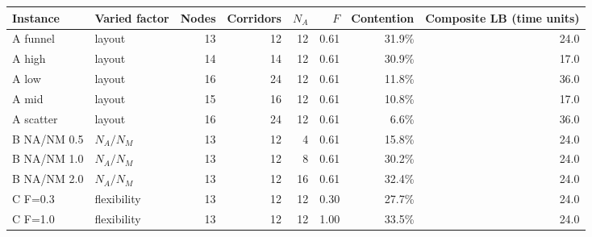 \begin{adjustbox}{max width=\linewidth}\begin{tabular}{@{}llrrrrrr@{}}
\toprule
Instance & Varied factor & Nodes & Corridors & $N_A$ & $F$ & Contention & Composite LB (time units) \\
\midrule
A funnel & layout & 13 & 12 & 12 & 0.61 & 31.9\% & 24.0 \\
A high & layout & 14 & 14 & 12 & 0.61 & 30.9\% & 17.0 \\
A low & layout & 16 & 24 & 12 & 0.61 & 11.8\% & 36.0 \\
A mid & layout & 15 & 16 & 12 & 0.61 & 10.8\% & 17.0 \\
A scatter & layout & 16 & 24 & 12 & 0.61 & 6.6\% & 36.0 \\
\midrule
B NA/NM 0.5 & $N_A/N_M$ & 13 & 12 & 4 & 0.61 & 15.8\% & 24.0 \\
B NA/NM 1.0 & $N_A/N_M$ & 13 & 12 & 8 & 0.61 & 30.2\% & 24.0 \\
B NA/NM 2.0 & $N_A/N_M$ & 13 & 12 & 16 & 0.61 & 32.4\% & 24.0 \\
\midrule
C F=0.3 & flexibility & 13 & 12 & 12 & 0.30 & 27.7\% & 24.0 \\
C F=1.0 & flexibility & 13 & 12 & 12 & 1.00 & 33.5\% & 24.0 \\
\bottomrule
\end{tabular}\end{adjustbox}
